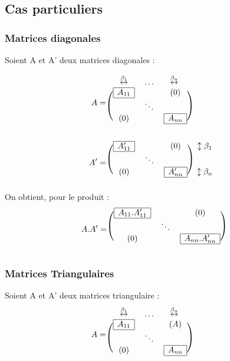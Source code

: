 \subsection{Cas particuliers}
\subsubsection{Matrices diagonales}
Soient A et A' deux matrices diagonales : 

\[A = \begin{blockarray}{cccc}
         \overset{\beta_1}\leftrightarrow & \dots & \overset{\beta_n}\leftrightarrow  \\
        \begin{block}{(ccc)c}
         \mesbloc{A_{11}}  &  & (0)  & ~~~~~ \\
                            &\ddots  & & ~~~~~     \\
         (0)                &  & \mesbloc{A_{nn}}  & ~~~~~\\
        \end{block}
        \end{blockarray}
\]

\[A' = \begin{blockarray}{cccc}
        \begin{block}{(ccc)c}
         \mesbloc{A'_{11}}  &  & (0) & \updownarrow \beta_1   \\
                            &\ddots  &      &  \\
         (0)                &  & \mesbloc{A'_{nn}} & \updownarrow\beta_n   \\
        \end{block}
        \end{blockarray}
\] 
On obtient, pour le produit : 
\[A.A' = \begin{blockarray}{ccc}
        \begin{block}{(ccc)}
         \mesbloc{A_{11}.A'_{11}}  &  & (0)    \\
                            &\ddots  &        \\
         (0)                &  & \mesbloc{A_{nn}.A'_{nn}}   \\
        \end{block}
        \end{blockarray}
\] 
\subsubsection{Matrices Triangulaires}
Soient A et A' deux matrices triangulaire : 
\[A = \begin{blockarray}{cccc}
         \overset{\beta_1}\leftrightarrow & \dots & \overset{\beta_n}\leftrightarrow  \\
        \begin{block}{(ccc)c}
         \mesbloc{A_{11}}  &  & (A)  & ~~~~~ \\
                            &\ddots  & & ~~~~~     \\
         (0)                &  & \mesbloc{A_{nn}}  & ~~~~~\\
        \end{block}
        \end{blockarray}
\]

